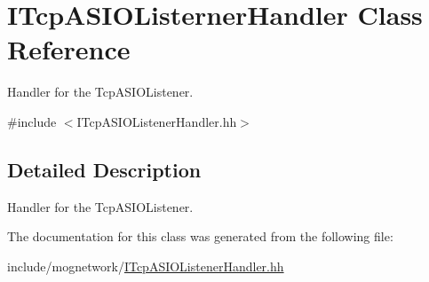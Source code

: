 \hypertarget{class_i_tcp_a_s_i_o_listerner_handler}{\section{I\-Tcp\-A\-S\-I\-O\-Listerner\-Handler Class Reference}
\label{class_i_tcp_a_s_i_o_listerner_handler}
}


Handler for the Tcp\-A\-S\-I\-O\-Listener.  




{\ttfamily \#include $<$I\-Tcp\-A\-S\-I\-O\-Listener\-Handler.\-hh$>$}



\subsection{Detailed Description}
Handler for the Tcp\-A\-S\-I\-O\-Listener. 

The documentation for this class was generated from the following file\-:\begin{DoxyCompactItemize}
\item 
include/mognetwork/\hyperlink{_i_tcp_a_s_i_o_listener_handler_8hh}{I\-Tcp\-A\-S\-I\-O\-Listener\-Handler.\-hh}\end{DoxyCompactItemize}
